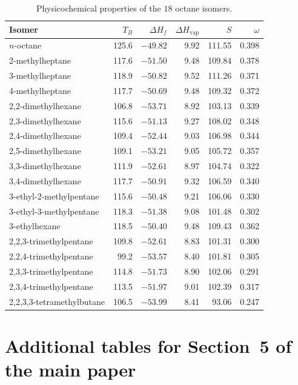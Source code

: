 \documentclass[a5paper, 10pt]{article}
\theoremstyle{plain}
\theoremstyle{remark}
\theoremstyle{definition}
\begin{document}
\begin{table}[H]
\centering\small
\caption{Physicochemical properties of the $18$ octane isomers.}
\label{tab:octane-data}
\begin{tabular}{lrrrrr}
\toprule
Isomer & $T_B$ & $\Delta H_f$ & $\Delta H_{\mathrm{vap}}$ & $S$ & $\omega$\\
\midrule
$n$-octane & 125.6 & $-49.82$ & 9.92 & 111.55 & 0.398\\
2-methylheptane & 117.6 & $-51.50$ & 9.48 & 109.84 & 0.378\\
3-methylheptane & 118.9 & $-50.82$ & 9.52 & 111.26 & 0.371\\
4-methylheptane & 117.7 & $-50.69$ & 9.48 & 109.32 & 0.372\\
2,2-dimethylhexane & 106.8 & $-53.71$ & 8.92 & 103.13 & 0.339\\
2,3-dimethylhexane & 115.6 & $-51.13$ & 9.27 & 108.02 & 0.348\\
2,4-dimethylhexane & 109.4 & $-52.44$ & 9.03 & 106.98 & 0.344\\
2,5-dimethylhexane & 109.1 & $-53.21$ & 9.05 & 105.72 & 0.357\\
3,3-dimethylhexane & 111.9 & $-52.61$ & 8.97 & 104.74 & 0.322\\
3,4-dimethylhexane & 117.7 & $-50.91$ & 9.32 & 106.59 & 0.340\\
3-ethyl-2-methylpentane & 115.6 & $-50.48$ & 9.21 & 106.06 & 0.330\\
3-ethyl-3-methylpentane & 118.3 & $-51.38$ & 9.08 & 101.48 & 0.302\\
3-ethylhexane & 118.5 & $-50.40$ & 9.48 & 109.43 & 0.362\\
2,2,3-trimethylpentane & 109.8 & $-52.61$ & 8.83 & 101.31 & 0.300\\
2,2,4-trimethylpentane & 99.2 & $-53.57$ & 8.40 & 101.81 & 0.305\\
2,3,3-trimethylpentane & 114.8 & $-51.73$ & 8.90 & 102.06 & 0.291\\
2,3,4-trimethylpentane & 113.5 & $-51.97$ & 9.01 & 102.39 & 0.317\\
2,2,3,3-tetramethylbutane & 106.5 & $-53.99$ & 8.41 & 93.06 & 0.247\\
\bottomrule
\end{tabular}
\end{table}

\section{Additional tables for Section~5 of the main paper}\label{sec:s-tables}
\end{document}
